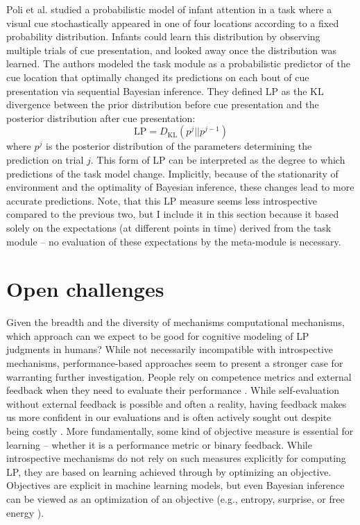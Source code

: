 Poli et al. \cite{poli_infants_2020} studied a probabilistic model of infant attention in a task where a visual cue stochastically appeared in one of four locations according to a fixed probability distribution. Infants could learn this distribution by observing multiple trials of cue presentation, and looked away once the distribution was learned. The authors modeled the task module as a probabilistic predictor of the cue location that optimally changed its predictions on each bout of cue presentation via sequential Bayesian inference. They defined \ac{LP} as the KL divergence between the prior distribution before cue presentation and the posterior distribution after cue presentation:
\begin{equation}
    \mathrm{LP} = D_{\mathrm{KL}}(p^j||p^{j-1})
\end{equation}
where $p^j$ is the posterior distribution of the parameters determining the prediction on trial $j$. This form of \ac{LP} can be interpreted as the degree to which predictions of the task model change. Implicitly, because of the stationarity of environment and the optimality of Bayesian inference, these changes lead to more accurate predictions. Note, that this \ac{LP} measure seems less introspective compared to the previous two, but I include it in this section because it based solely on the expectations (at different points in time) derived from the task module -- no evaluation of these expectations by the meta-module is necessary. 

\section{Open challenges}

Given the breadth and the diversity of mechanisms computational mechanisms, which approach can we expect to be good for cognitive modeling of \ac{LP} judgments in humans? While not necessarily incompatible with introspective mechanisms, performance-based approaches seem to present a stronger case for warranting further investigation. People rely on competence metrics and external feedback when they need to evaluate their performance \cite{marti_certainty_2018,desender_subjective_2018,locke_performance_2020}. While self-evaluation without external feedback is possible and often a reality, having feedback makes us more confident in our evaluations \cite{rouault_forming_2019} and is often actively sought out despite being costly \cite{holm_episodic_2019,fitzgibbon_lure_2021}. More fundamentally, some kind of objective measure is essential for learning -- whether it is a performance metric or binary feedback. While introspective mechanisms do not rely on such measures explicitly for computing \ac{LP}, they are based on learning achieved through by optimizing an objective. Objectives are explicit in machine learning models, but even Bayesian inference can be viewed as an optimization of an objective (e.g., entropy, surprise, or free energy \cite{friston_free-energy_2009}).

